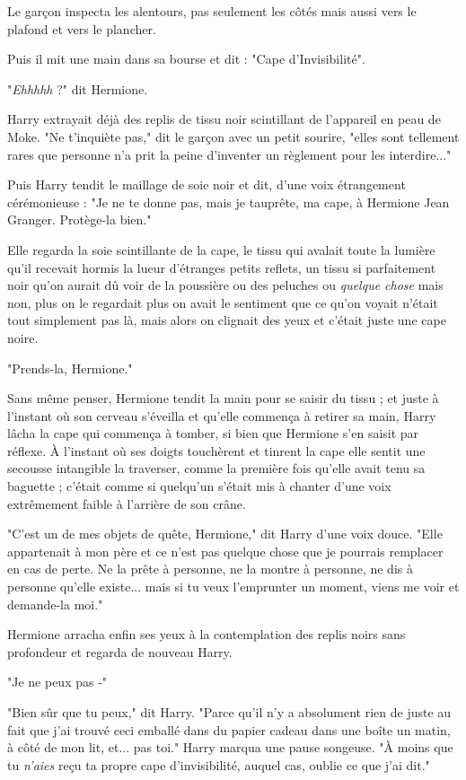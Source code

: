 Le garçon inspecta les alentours, pas seulement les côtés mais aussi vers le plafond et vers le plancher.

Puis il mit une main dans sa bourse et dit : "Cape d'Invisibilité".

"\emph{Ehhhhh}  ?" dit Hermione.

Harry extrayait déjà des replis de tissu noir scintillant de l'appareil en peau de Moke. "Ne t'inquiète pas," dit le garçon avec un petit sourire, "elles sont tellement rares que personne n'a prit la peine d'inventer un règlement pour les interdire..."

Puis Harry tendit le maillage de soie noir et dit, d'une voix étrangement cérémonieuse : "Je ne te donne pas, mais je tauprête, ma cape, à Hermione Jean Granger. Protège-la bien."

Elle regarda la soie scintillante de la cape, le tissu qui avalait toute la lumière qu'il recevait hormis la lueur d'étranges petits reflets, un tissu si parfaitement noir qu'on aurait dû voir de la poussière ou des peluches ou \emph{quelque chose}  mais non, plus on le regardait plus on avait le sentiment que ce qu'on voyait n'était tout simplement pas là, mais alors on clignait des yeux et c'était juste une cape noire.

"Prends-la, Hermione."

Sans même penser, Hermione tendit la main pour se saisir du tissu ; et juste à l'instant où son cerveau s'éveilla et qu'elle commença à retirer sa main, Harry lâcha la cape qui commença à tomber, si bien que Hermione s'en saisit par réflexe. À l'instant où ses doigts touchèrent et tinrent la cape elle sentit une secousse intangible la traverser, comme la première fois qu'elle avait tenu sa baguette ; c'était comme si quelqu'un s'était mis à chanter d'une voix extrêmement faible à l'arrière de son crâne.

"C'est un de mes objets de quête, Hermione," dit Harry d'une voix douce. "Elle appartenait à mon père et ce n'est pas quelque chose que je pourrais remplacer en cas de perte. Ne la prête à personne, ne la montre à personne, ne dis à personne qu'elle existe... mais si tu veux l'emprunter un moment, viens me voir et demande-la moi."

Hermione arracha enfin ses yeux à la contemplation des replis noirs sans profondeur et regarda de nouveau Harry.

"Je ne peux pas -"

"Bien sûr que tu peux," dit Harry. "Parce qu'il n'y a absolument rien de juste au fait que j'ai trouvé ceci emballé dans du papier cadeau dans une boîte un matin, à côté de mon lit, et... pas toi." Harry marqua une pause songeuse. "À moins que tu \emph{n'aies}  reçu ta propre cape d'invisibilité, auquel cas, oublie ce que j'ai dit."

